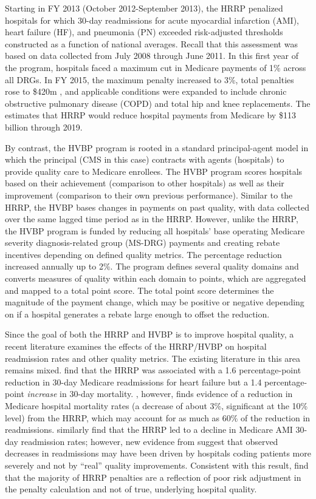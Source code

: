 \documentclass[12pt]{article}
\begin{document}
Starting in FY 2013 (October 2012-September 2013), the HRRP penalized hospitals for which 30-day readmissions for acute myocardial infarction (AMI), heart failure (HF), and pneumonia (PN) exceeded risk-adjusted thresholds constructed as a function of national averages. Recall that this assessment was based on data collected from July 2008 through June 2011. In this first year of the program, hospitals faced a maximum cut in Medicare payments of 1\% across all DRGs. In FY 2015, the maximum penalty increased to 3\%, total penalties rose to \$420m \citep{rau2015}, and applicable conditions were expanded to include chronic obstructive pulmonary disease (COPD) and total hip and knee replacements. The \cite{cbo2010} estimates that HRRP would reduce hospital payments from Medicare by \$113 billion through 2019.

By contrast, the HVBP program is rooted in a standard principal-agent model in which the principal (CMS in this case) contracts with agents (hospitals) to provide quality care to Medicare enrollees. The HVBP program scores hospitals based on their achievement (comparison to other hospitals) as well as their improvement (comparison to their own previous performance).  Similar to the HRRP, the HVBP bases changes in payments on past quality, with data collected over the same lagged time period as in the HRRP. However, unlike the HRRP, the HVBP program is funded by reducing all hospitals' base operating Medicare severity diagnosis-related group (MS-DRG) payments and creating rebate incentives depending on defined quality metrics. The percentage reduction increased annually up to 2\%. The program defines several quality domains and converts measures of quality within each domain to points, which are aggregated and mapped to a total point score.  The total point score determines the magnitude of the payment change, which may be positive or negative depending on if a hospital generates a rebate large enough to offset the reduction.

Since the goal of both the HRRP and HVBP is to improve hospital quality, a recent literature examines the effects of the HRRP/HVBP on hospital readmission rates and other quality metrics. The existing literature in this area remains mixed. \cite{gupta2018} find that the HRRP was associated with a 1.6 percentage-point reduction in 30-day Medicare readmissions for heart failure but a 1.4 percentage-point \textit{increase} in 30-day mortality. \cite{gupta2016}, however, finds evidence of a reduction in Medicare hospital mortality rates (a decrease of about 3\%, significant at the 10\% level) from the HRRP, which may account for as much as 60$\%$ of the reduction in readmissions. \cite{mellor2016} similarly find that the HRRP led to a decline in Medicare AMI 30-day readmission rates; however, new evidence from \cite{Ibrahim2017} suggest that observed decreases in readmissions may have been driven by hospitals coding patients more severely and not by ``real'' quality improvements. Consistent with this result, \cite{wilcock2018} find that the majority of HRRP penalties are a reflection of poor risk adjustment in the penalty calculation and not of true, underlying hospital quality.
\end{document}
